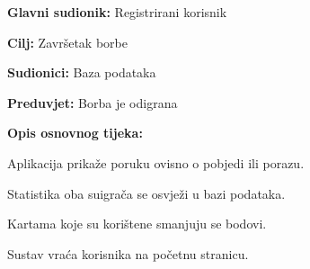 				\noindent {}
				\begin{packed_item}
					
					\item \textbf{Glavni sudionik: }Registrirani korisnik
					\item  \textbf{Cilj:} Završetak borbe
					\item  \textbf{Sudionici:} Baza podataka
					\item  \textbf{Preduvjet:} Borba je odigrana
					\item  \textbf{Opis osnovnog tijeka:}
					
					\item[] \begin{packed_enum}
						
						\item Aplikacija prikaže poruku ovisno o pobjedi ili porazu.
						\item Statistika oba suigrača se osvježi u bazi podataka.
						\item Kartama koje su korištene smanjuju se 	bodovi.
						\item Sustav vraća korisnika na početnu stranicu.
					\end{packed_enum}
				\end{packed_item}
				
